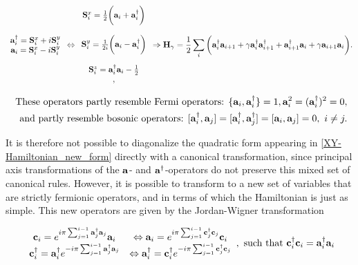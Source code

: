 \documentclass{homework}
\begin{document}
\begin{equation} \begin{array}{cc}
     {\bf a}_i^\dagger = {\bf S}_i^x + i {\bf S}_i^y \\ 
     {\bf a}_i = {\bf S}_{i}^x - i {\bf S}_i^y
\end{array} \Leftrightarrow
\begin{array}{c}
     {\bf S}_i^x = \frac{1}{2} \bigg({\bf a}_i+{\bf a}_i^\dagger \bigg)\\
     \\
     {\bf S}_i^y = \frac{1}{2i} \bigg({\bf a}_i-{\bf a}_i^\dagger\bigg)\\
     \\
     {\bf S}_i^z = {\bf a}_i^\dagger {\bf a}_i - \frac{1}{2} \\,
\end{array} \Rightarrow {\bf H}_{\gamma} = \frac{1}{2} \sum_{i} \bigg({\bf a}_i^\dagger {\bf a}_{i+1} + \gamma {\bf a}_i^\dagger {\bf a}_{i+1}^\dagger + {\bf a}_{i+1}^\dagger {\bf a}_i + \gamma {\bf a}_{i+1} {\bf a}_{i}  \bigg).
\label{XY-Hamiltonian_new_form}
\end{equation}

\begin{equation*}
    \begin{split}
    \textnormal{ These operators partly resemble Fermi operators: } \{{\bf a}_i, {\bf a}_i^\dagger\} = 1, {\bf a}_i^2 = ({\bf a}_i^\dagger)^2 = 0, \\
    \textnormal{ and partly resemble bosonic operators: } [{\bf a}_i^\dagger, {\bf a}_j] = [{\bf a}_i^\dagger, {\bf a}_j^\dagger] = [{\bf a}_i, {\bf a}_j] = 0, \textnormal{ } i \neq j.
\end{split}
\end{equation*}

It is therefore not possible to diagonalize the quadratic form appearing in \cref{XY-Hamiltonian_new_form} directly with a canonical transformation, since principal axis transformations of the ${\bf a}$- and ${\bf a}^\dagger$-operators do not preserve this mixed set of canonical rules. However, it is possible to transform to a new set of variables that are strictly fermionic operators, and in terms of which the Hamiltonian is just as simple. This new operators are given by the Jordan-Wigner transformation

\begin{equation}
    \begin{array}{cc}
         {\bf c}_i = e^{i\pi \sum_{j=1}^{i-1} {\bf a}_j^\dagger {\bf a}_j} {\bf a}_i & \Leftrightarrow {\bf a}_i = e^{i\pi \sum_{j=1}^{i-1} {\bf c}_j^\dagger {\bf c}_j} {\bf c}_i \\
         {\bf c}_i^\dagger = {\bf a}_i^\dagger e^{-i\pi \sum_{j=1}^{i-1} {\bf a}_j^\dagger {\bf a}_j} & \Leftrightarrow {\bf a}_i^\dagger = {\bf c}_i^\dagger e^{-i\pi \sum_{j=1}^{i-1} {\bf c}_j^\dagger {\bf c}_j}
    \end{array}, \textnormal{ such that } {\bf c}_i^\dagger {\bf c}_i = {\bf a}_i^\dagger {\bf a}_i 
    \label{XY_Jordan_Wigner}
\end{equation}
\end{document}
